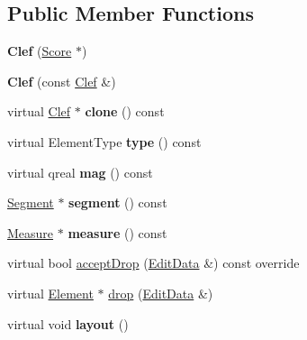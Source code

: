 \subsection*{Public Member Functions}
\begin{DoxyCompactItemize}
\item 
\mbox{\label{class_ms_1_1_clef_a62e962fccc62130cbc5d740377733850}} 
{\bfseries Clef} (\hyperlink{class_ms_1_1_score}{Score} $\ast$)
\item 
\mbox{\label{class_ms_1_1_clef_a0632f156bdbbf0b50bb69b9f0fba09a8}} 
{\bfseries Clef} (const \hyperlink{class_ms_1_1_clef}{Clef} \&)
\item 
\mbox{\label{class_ms_1_1_clef_ab462261eb60d2d1ee4b3489a08dbc2da}} 
virtual \hyperlink{class_ms_1_1_clef}{Clef} $\ast$ {\bfseries clone} () const
\item 
\mbox{\label{class_ms_1_1_clef_abe00e48c58edffa99ccca0eebeccbd71}} 
virtual Element\+Type {\bfseries type} () const
\item 
\mbox{\label{class_ms_1_1_clef_a132ca451d84f27b1dcad45c27a922443}} 
virtual qreal {\bfseries mag} () const
\item 
\mbox{\label{class_ms_1_1_clef_aa272fd0b0513535115ec6469108c1608}} 
\hyperlink{class_ms_1_1_segment}{Segment} $\ast$ {\bfseries segment} () const
\item 
\mbox{\label{class_ms_1_1_clef_a0a2c38e6575041d6f382e5aec3ed322e}} 
\hyperlink{class_ms_1_1_measure}{Measure} $\ast$ {\bfseries measure} () const
\item 
virtual bool \hyperlink{class_ms_1_1_clef_ae91b3164063b5e25e704fdcd4fa292a3}{accept\+Drop} (\hyperlink{class_ms_1_1_edit_data}{Edit\+Data} \&) const override
\item 
virtual \hyperlink{class_ms_1_1_element}{Element} $\ast$ \hyperlink{class_ms_1_1_clef_a3a9ca86d904b55728c1cd9c65b15ecef}{drop} (\hyperlink{class_ms_1_1_edit_data}{Edit\+Data} \&)
\item 
\mbox{\label{class_ms_1_1_clef_addb1519a7fcc3bfe02a5d20705804daa}} 
virtual void {\bfseries layout} ()

\end{DoxyCompactItemize}
